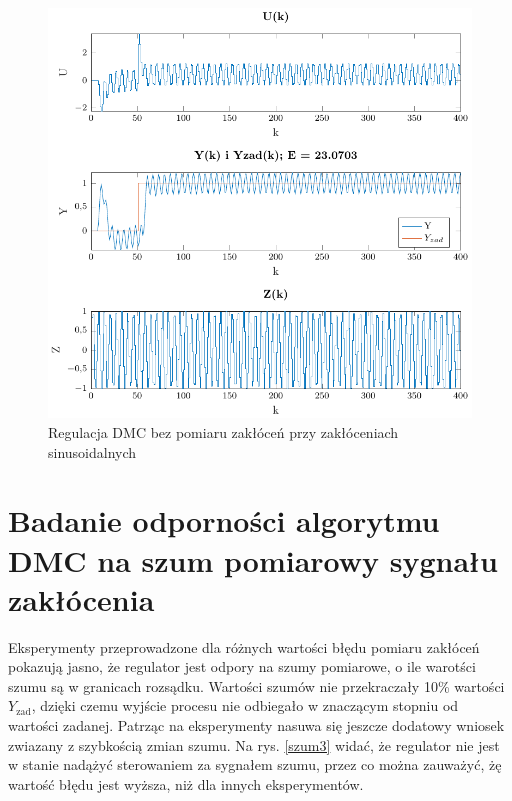 \documentclass[a4paper,titlepage,11pt,twosides,floatssmall]{mwrep}
\begin{document}
\begin{figure}[H]
	\centering
	\includegraphics[scale=0.85]{../../Lab2/PDF_rysunki/Z6_DMCSinBezOdsprz.pdf}
	\caption{Regulacja DMC bez pomiaru zakłóceń przy zakłóceniach sinusoidalnych}
	\label{sin_bez_pom}
\end{figure}

\section{Badanie odporności algorytmu DMC na szum pomiarowy sygnału zakłócenia}
Eksperymenty przeprowadzone dla różnych wartości błędu pomiaru zakłóceń pokazują jasno, że regulator jest odpory na szumy pomiarowe, o ile warotści szumu są w granicach rozsądku. Wartości szumów nie przekraczały 10\% wartości $Y_{\mathrm{zad}}$, dzięki czemu wyjście procesu nie odbiegało w znaczącym stopniu od wartości zadanej. Patrząc na eksperymenty nasuwa się jeszcze dodatowy wniosek zwiazany z szybkością zmian szumu. Na rys. \ref{szum3} widać, że regulator nie jest w stanie nadążyć sterowaniem za sygnałem szumu, przez co można zauważyć, żę wartość błędu jest wyższa, niż dla innych eksperymentów.
\end{document}
